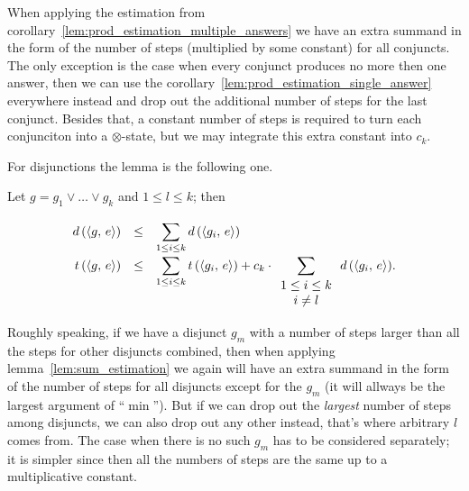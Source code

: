 When applying the estimation from corollary~\ref{lem:prod_estimation_multiple_answers} we have an extra summand in the form of the number of steps (multiplied by some constant) for all conjuncts.
The only exception is the case when every conjunct produces no more then one answer, then we can use the corollary~\ref{lem:prod_estimation_single_answer} everywhere instead and drop out the
additional number of steps for the last conjunct. Besides that, a constant number of steps is required to turn each conjunciton into a $\otimes$-state, but we may integrate this extra constant into $c_k$.

For disjunctions the lemma is the following one.

\begin{lemma}
\label{lem:disjunction_metrics_calc}

Let $g = g_1 \lor \dots \lor g_k$ and $1 \le l \le k$; then

\[
\renewcommand{\arraystretch}{1.5}
\begin{array}{rcl}
  d\,(\taskst{g}{e}) &\le& \displaystyle\sum\limits_{1 \le i \le k} d\,(\taskst{g_i}{e}) \\
  t\,(\taskst{g}{e}) &\le& \displaystyle\sum\limits_{1 \le i \le k} t\,(\taskst{g_i}{e}) + c_k\cdot \displaystyle\sum\limits_{\renewcommand{\arraystretch}{1}\begin{array}{c}1 \le i \le k \\ i \ne l\end{array}} d\,(\taskst{g_i}{e}).
\end{array}
\]

\end{lemma}

Roughly speaking, if we have a disjunct $g_m$ with a number of steps larger than all the steps for other disjuncts combined, then when applying lemma~\ref{lem:sum_estimation} we again will have an
extra summand in the form of the number of steps for all disjuncts except for the $g_m$ (it will allways be the largest argument of ``$\min$''). But if we can drop out the \emph{largest}
number of steps among disjuncts, we can also drop out any other instead, that's where arbitrary $l$ comes from. The case when there is no such $g_m$ has to be considered separately; it is simpler
since then all the numbers of steps are the same up to a multiplicative constant.

